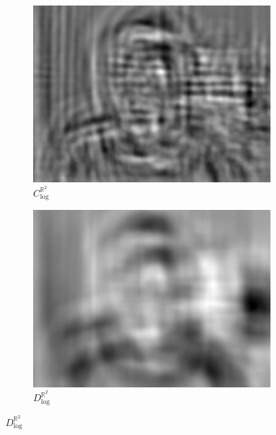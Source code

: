 \documentclass{article}
\begin{document}
\begin{figure}[h!]
\begin{subfigure}[b]{0.1\textwidth}
        \label{fig:mean and std of net44}
    \end{subfigure}
    \hspace{-1\baselineskip}
    \quad
    \begin{subfigure}[b]{0.1\textwidth}   
        \centering 
        \includegraphics[width=\textwidth]{plots/C_log_R2_conv.jpg}
        \caption{$C_{\text{log}}^{\mathbb{R}^2}$}%
        
        \label{fig:mean and std of net44}
    \end{subfigure}
    \hspace{-1\baselineskip}
    \quad
    \begin{subfigure}[b]{0.1\textwidth}   
        \centering 
        \includegraphics[width=\textwidth]{plots/D_log_R2_conv.jpg}
        \caption{$D_{\text{log}}^{\mathbb{R}^2}$}%
        

\end{subfigure}
\end{figure}
\end{document}
